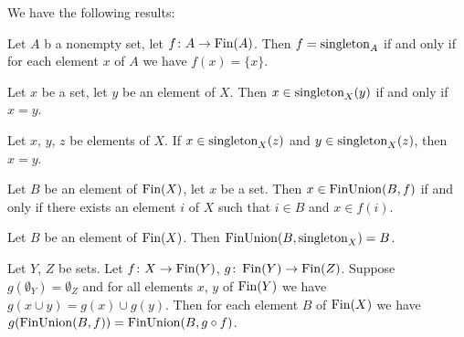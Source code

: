 \documentclass{article}
\begin{document}
We have the following results:
\begin{thm}
\item\label{setwiseo:54} Let $A$ b a nonempty set, let $f\colon A\to\operatorname{Fin}(A)$.
  Then $f=\operatorname{singleton}_{A}$ if and only if for each element $x$ of $A$ we
  have $f(x)=\{x\}$.
\item\label{setwiseo:55} Let $x$ be a set, let $y$ be an element of $X$.
  Then $x\in\operatorname{singleton}_{X}(y)$ if and only if $x=y$.
\item\label{setwiseo:56} Let $x$, $y$, $z$ be elements of $X$.
  If $x\in\operatorname{singleton}_{X}(z)$ and $y\in\operatorname{singleton}_{X}(z)$, then $x=y$.
\item\label{setwiseo:57} Let $B$ be an element of $\operatorname{Fin}(X)$, let $x$ be
  a set. Then $x\in\operatorname{FinUnion}(B,f)$ if and only if there exists an
  element $i$ of $X$ such that $i\in B$ and $x\in f(i)$.
\item\label{setwiseo:58} Let $B$ be an element of $\operatorname{Fin}(X)$.
  Then $\operatorname{FinUnion}(B,\operatorname{singleton}_{X})=B$.
\item\label{setwiseo:59} Let $Y$, $Z$ be sets.
  Let $f\colon X\to\operatorname{Fin}(Y)$, $g\colon\operatorname{Fin}(Y)\to\operatorname{Fin}(Z)$.
  Suppose $g(\emptyset_{Y})=\emptyset_{Z}$ and for all elements $x$, $y$
  of $\operatorname{Fin}(Y)$ we have $g(x\cup y)=g(x)\cup g(y)$.
  Then for each element $B$ of $\operatorname{Fin}(X)$ we have
  $g(\operatorname{FinUnion}(B,f))=\operatorname{FinUnion}(B,g\circ f)$.
\end{thm}
\end{document}
